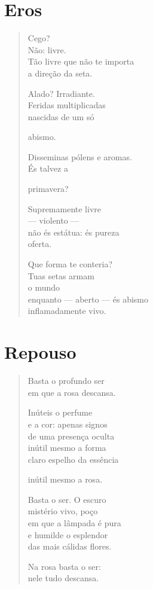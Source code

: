 \chapter{Eros}

\begin{verse}
Cego?\\
Não: livre.\\
Tão livre que não te importa\\
a direção da seta.

Alado? Irradiante.\\
Feridas multiplicadas\\
nascidas de um só

\hfill abismo.

Disseminas pólens e aromas.\\
És talvez a

\hfill primavera?

Supremamente livre\\
\quad\quad\quad --- violento ---\\
não és estátua: és pureza\\
\hfill oferta.

Que forma te conteria?\\
Tuas setas armam\\
\hfill o mundo\\
enquanto --- aberto --- és abismo\\
\hfill inflamadamente vivo.
\end{verse}

\chapter{Repouso}

\begin{verse}
Basta o profundo ser\\
em que a rosa descansa.

Inúteis o perfume\\
e a cor: apenas signos\\
de uma presença oculta\\
inútil mesmo a forma\\
claro espelho da essência

inútil mesmo a rosa.

Basta o ser. O escuro\\
mistério vivo, poço\\
em que a lâmpada é pura\\
e humilde o esplendor\\
das mais cálidas flores.

Na rosa basta o ser:\\
nele tudo descansa.
\end{verse}


